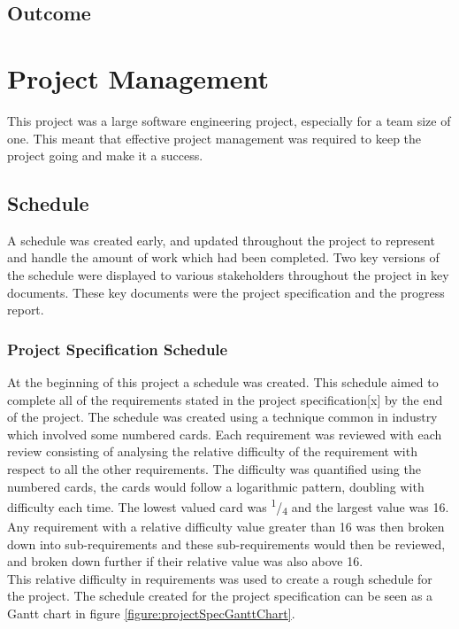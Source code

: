 \documentclass{article}
\begin{document}
\subsection{Outcome}

\section{Project Management}
\label{section:projectManagement}

This project was a large software engineering project, especially for a team size of one. This meant that effective project management was required to keep the project going and make it a success. 

\subsection{Schedule}

A schedule was created early, and updated throughout the project to represent and handle the amount of work which had been completed. Two key versions of the schedule were displayed to various stakeholders throughout the project in key documents. These key documents were the project specification and the progress report. 

\subsubsection{Project Specification Schedule}

At the beginning of this project a schedule was created. This schedule aimed to complete all of the requirements stated in the project specification[x] by the end of the project. The schedule was created using a technique common in industry which involved some numbered cards. Each requirement was reviewed with each review consisting of analysing the relative difficulty of the requirement with respect to all the other requirements. The difficulty was quantified using the numbered cards, the cards would follow a logarithmic pattern, doubling with difficulty each time. The lowest valued card was \textsuperscript{1}/\textsubscript{4} and the largest value was 16. Any requirement with a relative difficulty value greater than 16 was then broken down into sub-requirements and these sub-requirements would then be reviewed, and broken down further if their relative value was also above 16. \\

This relative difficulty in requirements was used to create a rough schedule for the project. The schedule created for the project specification can be seen as a Gantt chart in figure \ref{figure:projectSpecGanttChart}. \\
\end{document}
